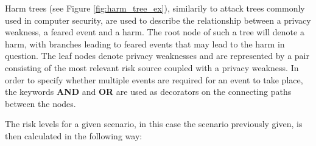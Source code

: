 Harm trees (see Figure \ref{fig:harm_tree_ex}), similarily to attack trees
commonly used in computer security\cite{de:hal-01302541}, are used to describe the
relationship between a privacy weakness, a feared event and a harm. The root node of such a tree will denote a harm, with branches leading
to feared events that may lead to the harm in question. The leaf nodes denote
privacy weaknesses and are represented by a pair consisting of the most relevant
risk source coupled with a privacy weakness. In order to specify whether
multiple events are required for an event to take place, the keywords
\textbf{AND} and \textbf{OR} are used as decorators on the connecting paths
between the nodes.

\bigskip

The risk levels for a given scenario, in this case the scenario previously
given, is then calculated in the following way\cite{de:hal-01302541}:


